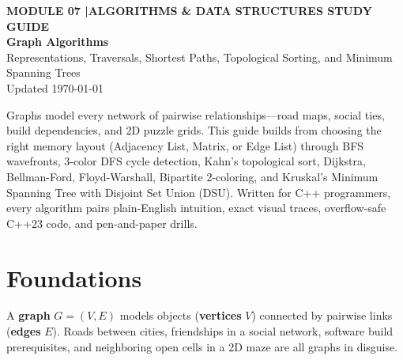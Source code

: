 \documentclass[11pt,a4paper]{article}
\newcommand{\sectionbreak}{}
\theoremstyle{definition}
\begin{document}
\thispagestyle{plain}
\begin{tcolorbox}[
    enhanced,
    colback=primaryblue!6, colframe=primaryblue!20,
    borderline west={5pt}{0pt}{primaryblue},
    arc=4pt, boxrule=0.6pt,
    left=14pt, right=14pt, top=7pt, bottom=7pt,
    before skip=0pt, after skip=5pt
]
    {\footnotesize\bfseries\color{accentteal}MODULE 07 \quad|\quad ALGORITHMS \& DATA STRUCTURES STUDY GUIDE}\\[3pt]
    {\Huge\bfseries\color{primaryblue}Graph Algorithms}\\[3pt]
    {\large\color{codegray}Representations, Traversals, Shortest Paths, Topological Sorting, and Minimum Spanning Trees}\\[4pt]
    {\footnotesize\color{codegray}Updated \today}
\end{tcolorbox}

\begin{overviewbox}
Graphs model every network of pairwise relationships---road maps, social ties, build dependencies, and 2D puzzle grids. This guide builds from choosing the right memory layout (Adjacency List, Matrix, or Edge List) through BFS wavefronts, 3-color DFS cycle detection, Kahn's topological sort, Dijkstra, Bellman-Ford, Floyd-Warshall, Bipartite 2-coloring, and Kruskal's Minimum Spanning Tree with Disjoint Set Union (DSU). Written for C++ programmers, every algorithm pairs plain-English intuition, exact visual traces, overflow-safe C++23 code, and pen-and-paper drills.
\end{overviewbox}

\vspace{-5pt}
{\setlength{\parskip}{0pt}\linespread{0.95}\footnotesize\tableofcontents}

\renewcommand{\sectionbreak}{\clearpage}

\section{Foundations}

A \textbf{graph} $G = (V, E)$ models objects (\textbf{vertices} $V$) connected by pairwise links (\textbf{edges} $E$). Roads between cities, friendships in a social network, software build prerequisites, and neighboring open cells in a 2D maze are all graphs in disguise.
\end{document}
